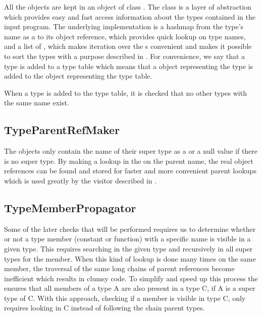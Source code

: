 All the  objects are kept in an object of class
. The  class is a layer of abstraction
which provides easy and fast access information about the types contained in the
input program. The underlying implementation is a hashmap from the type's name
as a  to its object reference, which provides quick lookup on
type names, and a list of , which makes iteration over the
s convenient and makes it possible to sort the types
with a purpose described in . For convenience, we
say that a type is added to a type table which means that a
 object representing the type is added to the
 object representing the type table.

When a type is added to the type table, it is checked that no other types with
the same name exist.

\subsection{TypeParentRefMaker}
\label{sec:TypeParentRefMaker}
The  objects only contain the name of their super type
as a  or a null value if there is no super type. By making a
lookup in the  on the parent name, the real object
references can be found and stored for faster and more convenient parent lookups
which is used greatly by the visitor described in
.

\subsection{TypeMemberPropagator}
\label{sec:TypeMemberPropagator}
Some of the later checks that will be performed requires us to determine whether
or not a type member (constant or function) with a specific name is visible in a
given type. This requires searching in the given type and recursively in all
super types for the member. When this kind of lookup is done many times on the
same member, the traversal of the same long chains of parent references become
inefficient which results in clumsy code. To simplify and speed up this process
the  ensures that all members of a type A are
also present in a type C, if A is a super type of C. With this approach,
checking if a member is visible in type C, only requires looking in C instead of
following the chain parent types.


